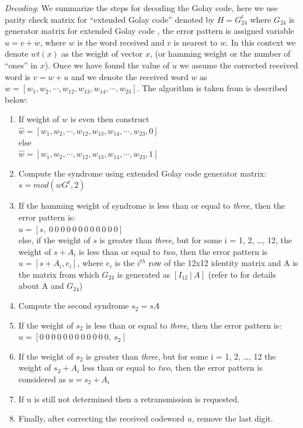 \emph{Decoding}: We summarize the steps for decoding the Golay code, here we use parity check matrix for ``extended Golay code'' denoted by $H = G^t_{24}$ where $G_{24}$ is generator matrix for extended Golay code \cite{golay}, the error pattern is assigned variable $u = v + w$, where $w$ is the word received and $v$ is nearest to $w$. In this context we denote $wt(x)$ as the weight of vector $x$, (or hamming weight or the number of ``ones'' in $x$). Once we have found the value of $u$ we assume the
corrected received word is $v = w + u$ and we denote the received word $w$ as $w = [w_1, w_2, \cdots , w_{12}, w_{13}, w_{14}, \cdots , w_{23}]$. The algorithm is taken from \cite{golay} is described below:
\begin{enumerate}
	\item If weight of $w$ is even then construct\\
		\tab $\hat{w} = [ w_1, w_2, \cdots , w_{12}, w_{13}, w_{14}, \cdots , w_{23}, 0]$\\
		  else\\
		\tab $\hat{w} = [ w_1, w_2, \cdots , w_{12}, w_{13}, w_{14}, \cdots , w_{23}, 1]$\\
	\item Compute the syndrome using extended Golay code generator matrix:\\
		\tab \tab \tab \tab $s = mod(wG^t, 2)$
	\item If the hamming weight of syndrome is less than or equal to \emph{three}, then the error pattern is:\\
		\tab \tab \tab $u = [s,\  0\  0\  0\  0\  0\  0\  0\  0\  0\  0\  0\  0]$\\
		else, if the weight of $s$ is greater than \emph{three}, but for some i = 1, 2, \ldots, 12, the weight of $s + A_i$ is less than or equal to \emph{two}, then the error pattern is $u = [ s + A_i, e_i]$, where $e_i$ is the $i^{th}$ row of the 12x12 identity matrix and A is the matrix from which $G_{24}$ is generated as $[I_{12}\:|\:A]$ (refer to \cite{golay} for details about A and $G_{24}$)
	\item Compute the second  syndrome $s_2 = s A$
	\item If the weight of $s_2$ is less than or equal to \emph{three}, then the error pattern is:\\
		\tab \tab \tab $u = [ 0\  0\  0\  0\  0\  0\  0\  0\  0\  0\  0\  0,\ s_2]$
	\item If the weight of $s_2$ is greater than \emph{three}, but for some i = 1, 2, \ldots, 12 the weight of $s_2 + A_i$ less than or equal to \emph{two}, then the error pattern is considered as $u = s_2 + A_i$
	\item If u is still not determined then a retransmission is requested.

	\item Finally, after correcting the received codeword $u$, remove the last digit.
\end{enumerate}

